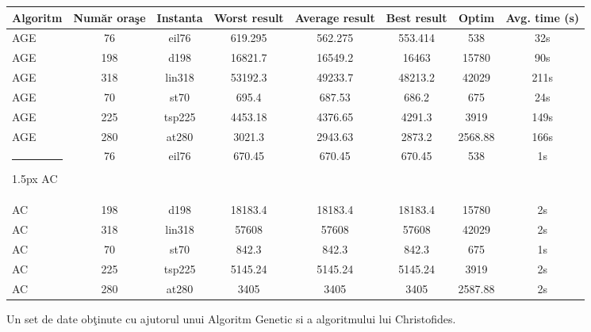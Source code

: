 \documentclass[11pt,leqno]{article}
\makeatletter
\def\hlinewd#1{%
	\noalign{\ifnum0=`}\fi\hrule \@height #1 %
	\futurelet\reserved@a\@xhline}
\makeatother
\begin{document}
	\begin{figure}[H]
		
		\begin{adjustwidth}{-50pt}{}
\begin{tabular}{|l|c|c|c|c|c|c|c|}
	\hline
	Algoritm & Num\u ar ora\c se & Instanta & Worst result & Average result & Best result & Optim   & Avg. time (s) \\ \hline 
	AGE      & 76                & eil76    & 619.295      & 562.275        & 553.414     & 538     & 32s           \\ \hline
	AGE      & 198               & d198     & 16821.7      & 16549.2        & 16463       & 15780   & 90s           \\ \hline
	AGE      & 318               & lin318   & 53192.3      & 49233.7        & 48213.2     & 42029   & 211s          \\ \hline
	AGE      & 70                & st70     & 695.4        & 687.53         & 686.2       & 675     & 24s            \\ \hline
	AGE      & 225               & tsp225   & 4453.18      & 4376.65        & 4291.3      & 3919    & 149s           \\ \hline
	AGE      & 280               & at280    & 3021.3       & 2943.63        & 2873.2      & 2568.88 & 166s           \\ \hlinewd{1.5px}
	AC       & 76                &  eil76        & 670.45       & 670.45         & 670.45      &   538      & 1s            \\ \hline 
	AC       & 198               &  d198        & 18183.4      & 18183.4        & 18183.4     & 15780        & 2s            \\ \hline
	AC       & 318               &  lin318        & 57608        & 57608          & 57608       &  42029       & 2s            \\ \hline
	AC       & 70                  &   st70       &     842.3         &     842.3            &    842.3          &  675        &  1s             \\ \hline 
	AC       & 225                  &  tsp225       &      5145.24           &     5145.24           &   5145.24             & 3919        &   2s             \\ \hline
	AC       & 280                  &   at280      &     3405          &    3405            &    3405          &  2587.88       &  2s              \\ \hline
\end{tabular}

			
		\end{adjustwidth}
		
		\caption{Un set de date ob\c tinute cu ajutorul unui Algoritm Genetic si a algoritmului lui  Christofides.}
	\end{figure}
\end{document}
